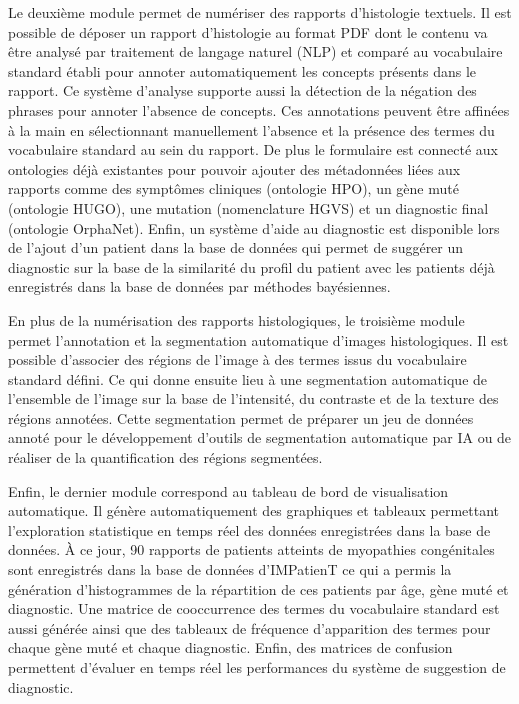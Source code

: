 Le deuxième module permet de numériser des rapports d’histologie textuels. Il est possible de déposer un rapport d’histologie au format PDF dont le contenu va être analysé par traitement de langage naturel (NLP)  et comparé au vocabulaire standard établi pour annoter automatiquement les concepts présents dans le rapport. Ce système d’analyse supporte aussi la détection de la négation des phrases pour annoter l’absence de concepts. Ces annotations peuvent être affinées à la main en sélectionnant manuellement l’absence et la présence des termes du vocabulaire standard au sein du rapport. De plus le formulaire est connecté aux ontologies déjà existantes pour pouvoir ajouter des métadonnées liées aux rapports comme des symptômes cliniques (ontologie HPO), un gène muté (ontologie HUGO), une mutation (nomenclature HGVS) et un diagnostic final (ontologie OrphaNet). Enfin, un système d’aide au diagnostic est disponible lors de l’ajout d’un patient dans la base de données qui permet de suggérer un diagnostic sur la base de la similarité du profil du patient avec les patients déjà enregistrés dans la base de données par méthodes bayésiennes.

En plus de la numérisation des rapports histologiques, le troisième module permet l’annotation et la segmentation automatique d’images histologiques. Il est possible d’associer des régions de l’image à des termes issus du vocabulaire standard défini. Ce qui donne ensuite lieu à une segmentation automatique de l’ensemble de l’image sur la base de l’intensité, du contraste et de la texture des régions annotées. Cette segmentation permet de préparer un jeu de données annoté pour le développement d’outils de segmentation automatique par IA ou de réaliser de la quantification des régions segmentées.

Enfin, le dernier module correspond au tableau de bord de visualisation automatique. Il génère automatiquement des graphiques et tableaux permettant l’exploration statistique en temps réel des données enregistrées dans la base de données. À ce jour, 90 rapports de patients atteints de myopathies congénitales sont enregistrés dans la base de données d’IMPatienT ce qui a permis la génération d’histogrammes de la répartition de ces patients par âge, gène muté et diagnostic. Une matrice de cooccurrence des termes du vocabulaire standard est aussi générée ainsi que des tableaux de fréquence d’apparition des termes pour chaque gène muté et chaque diagnostic. Enfin, des matrices de confusion permettent d’évaluer en temps réel les performances du système de suggestion de diagnostic.

